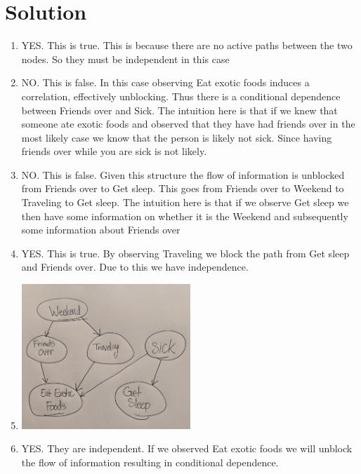 \documentclass[submit]{harvardml}
\begin{document}
\section*{Solution}
\begin{enumerate}
    \item YES. This is true. This is because there are no active paths between the two nodes. So they must be independent in this case
    
    \item NO. This is false. In this case observing Eat exotic foods induces a correlation, effectively unblocking. Thus there is a conditional dependence between Friends over and Sick. The intuition here is that if we knew that someone ate exotic foods and observed that they have had friends over in the most likely case we know that the person is likely not sick. Since having friends over while you are sick is not likely.
    
    \item NO. This is false. Given this structure the flow of information is unblocked from Friends over to Get sleep. This goes from Friends over to Weekend to Traveling to Get sleep. The intuition here is that if we observe Get sleep we then have some information on whether it is the Weekend and subsequently some information about Friends over
    
    \item YES. This is true. By observing Traveling we block the path from Get sleep and Friends over. Due to this we have independence.   
    
    \item \hspace{2cm} \newline
    \includegraphics[width=2.5in]{hw5/Pics/network.jpg}
    
    \item YES. They are independent. If we observed Eat exotic foods we will unblock the flow of information resulting in conditional dependence.
    
\end{enumerate}
\end{document}
